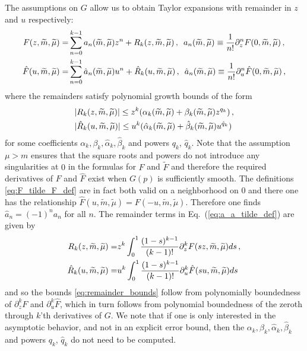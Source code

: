 \documentclass[sn-mathphys,Numbered]{sn-jnl}
\newcommand{\wt}[1]{\widetilde{#1}}
\newcommand{\req}[1]{Eq.~(\ref{#1})}
\begin{document}
The assumptions on $G$ allow us to obtain   Taylor expansions with remainder in $z$ and $u$ respectively:
\begin{align}\label{eq:a_a_tilde_def}
F(z,\wt{m},\wt{\mu})=&\sum_{n=0}^{k-1} a_{n}(\wt{m},\wt{\mu})z^n + R_k(z,\wt{m},\wt{\mu})\,,\,\,\, a_n(\wt{m},\wt{\mu})\equiv\frac{1}{n!}\partial_z^nF(0,\wt{m},\wt{\mu})\,,\\
\hat{F}(u,\wt{m},\wt{\mu})=&\sum_{n=0}^{k-1} \hat{a}_{n}(\wt{m},\wt{\mu})u^n + \hat{R}_k(u,\wt{m},\wt{\mu})\,,\,\,\,\hat{a}_n(\wt{m},\wt{\mu})\equiv\frac{1}{n!}\partial_u^n\hat{F}(0,\wt{m},\wt{\mu})\,,\notag
\end{align}
where the remainders satisfy polynomial growth bounds of the form 
\begin{align}\label{eq:remainder_bounds}
&|R_k(z,\wt{m},\wt{\mu})|\leq z^k(\alpha_k(\wt{m},\wt{\mu})+\beta_k(\wt{m},\wt{\mu}) z^{q_k})\,,\\
&|\hat{R}_k(u,\wt{m},\wt{\mu})|\leq u^k(\hat{\alpha}_k(\wt{m},\wt{\mu})+\hat{\beta}_k(\wt{m},\wt{\mu}) u^{\hat{q}_k})\notag
\end{align}
for some coefficients $\alpha_k,\beta_k,\hat{\alpha}_k,\hat{\beta}_k$ and powers $q_k$, $\hat{q}_k$.
 Note that the assumption $\mu>m$ ensures that the square roots and powers do not introduce any singularities at $0$ in the formulas for $F$ and $\widetilde F$ and therefore the required derivatives of $F$ and $\hat{F}$ exist when $G(p)$ is sufficiently smooth.   The definitions \eqref{eq:F_tilde_F_def} are in fact both valid on a neighborhood on $0$ and there one has the relationship $\hat{F}(u,\wt{m},\wt{\mu})=F(-u,\wt{m},\wt{\mu})$. Therefore one finds  $\hat{a}_n=(-1)^n{a}_n$ for all $n$. The remainder terms in \req{eq:a_a_tilde_def} are given by
 \begin{align}
    R_k(z,\wt{m},\wt{\mu})=& z^k\int_0^1\frac{(1-s)^{k-1}}{(k-1)!}\partial^k_{z}F(sz,\wt{m},\wt{\mu})ds\,,\\
       \hat{R}_k(u,\wt{m},\wt{\mu})=& u^k\int_0^1\frac{(1-s)^{k-1}}{(k-1)!}\partial^k_{u}\hat{F}(su,\wt{m},\wt{\mu})ds\notag
 \end{align}
and so the bounds \eqref{eq:remainder_bounds} follow from polynomially boundedness of   $\partial_z^k F$ and $\partial_u^k \hat{F}$,  which in turn follows from polynomial boundedness of the zeroth through $k$'th derivatives of $G$.  We note that if one is only interested in the asymptotic behavior, and not in an explicit error bound, then the $\alpha_k,\beta_k,\hat{\alpha}_k,\hat{\beta}_k$ and powers $q_k$, $\hat{q}_k$ do not need to be computed.  
 
\end{document}
